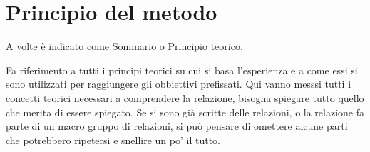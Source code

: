 \section{Principio del metodo}
A volte è indicato come Sommario o Principio teorico.

Fa riferimento a tutti i principi teorici su cui si basa l'esperienza e a come essi si sono utilizzati per raggiungere gli obbiettivi prefissati. Qui vanno messsi tutti i concetti teorici necessari a comprendere la relazione, bisogna spiegare tutto quello che merita di essere spiegato. Se si sono già scritte delle relazioni, o la relazione fa parte di un macro gruppo di relazioni, si può pensare di omettere alcune parti che potrebbero ripetersi e snellire un po' il tutto.